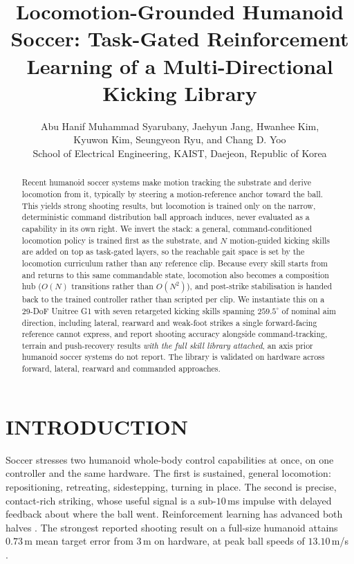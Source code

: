 \documentclass[letterpaper, 10 pt, conference]{ieeeconf}  %
\title{\LARGE \bf
Locomotion-Grounded Humanoid Soccer: Task-Gated Reinforcement\\
Learning of a Multi-Directional Kicking Library
}
\author{Abu Hanif Muhammad Syarubany, Jaehyun Jang, Hwanhee Kim,\\
Kyuwon Kim, Seungyeon Ryu, and Chang D. Yoo\\
\normalsize School of Electrical Engineering, KAIST, Daejeon, Republic of Korea%
}
\begin{document}
\maketitle
\thispagestyle{empty}
\pagestyle{empty}

\begin{abstract}

Recent humanoid soccer systems make motion tracking the substrate and derive
locomotion from it, typically by steering a motion-reference anchor toward the
ball. This yields strong shooting results, but locomotion is trained only on
the narrow, deterministic command distribution ball approach induces, never
evaluated as a capability in its own right. We invert the stack: a general,
command-conditioned locomotion policy is trained first as the substrate, and
$N$ motion-guided kicking skills are added on top as task-gated layers, so
the reachable gait space is set by the locomotion curriculum rather than any
reference clip. Because every skill starts from and returns to this same
commandable state, locomotion also becomes a composition hub ($O(N)$
transitions rather than $O(N^2)$), and post-strike stabilisation is handed
back to the trained controller rather than scripted per clip. We instantiate
this on a 29-DoF Unitree G1 with seven retargeted
kicking skills spanning $259.5^\circ$ of nominal aim direction, including
lateral, rearward and weak-foot strikes a single forward-facing reference
cannot express, and report shooting accuracy alongside command-tracking,
terrain and push-recovery results \emph{with the full skill library attached},
an axis prior humanoid soccer systems do not report. The library is validated
on hardware across forward, lateral, rearward and commanded approaches.

\end{abstract}

\section{INTRODUCTION}

Soccer stresses two humanoid whole-body control capabilities at once, on one
controller and the same hardware. The first is sustained, general locomotion:
repositioning, retreating, sidestepping, turning in place. The second is
precise, contact-rich striking, whose useful signal is a sub-$10$\,ms impulse
with delayed feedback about where the ball went. Reinforcement learning has
advanced both halves
\cite{haarnoja2024soccer,robonaldo,paid,striker,humanx,reactive,goalkeeper}.
The strongest reported shooting result on a full-size humanoid attains
$0.73$\,m mean target error from $3$\,m on hardware, at peak ball speeds of
$13.10$\,m/s \cite{robonaldo}.
\end{document}
